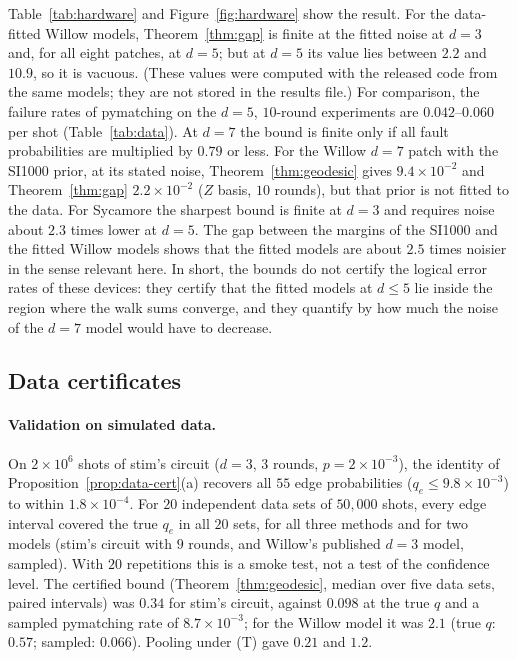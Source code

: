 \documentclass[11pt]{article}
\theoremstyle{plain}
\theoremstyle{definition}
\theoremstyle{remark}
\renewcommand{\_}{\oldunderscore\allowbreak}
\begin{document}
Table~\ref{tab:hardware} and Figure~\ref{fig:hardware} show the result. For the data-fitted Willow models, Theorem~\ref{thm:gap} is finite at the fitted noise at $d=3$ and, for all eight patches, at $d=5$; but at $d=5$ its value lies between $2.2$ and $10.9$, so it is vacuous. (These values were computed with the released code from the same models; they are not stored in the results file.) For comparison, the failure rates of pymatching on the $d=5$, $10$-round experiments are $0.042$--$0.060$ per shot (Table~\ref{tab:data}). At $d=7$ the bound is finite only if all fault probabilities are multiplied by $0.79$ or less. For the Willow $d=7$ patch with the SI1000 prior, at its stated noise, Theorem~\ref{thm:geodesic} gives $9.4\times10^{-2}$ and Theorem~\ref{thm:gap} $2.2\times10^{-2}$ ($Z$ basis, $10$ rounds), but that prior is not fitted to the data. For Sycamore the sharpest bound is finite at $d=3$ and requires noise about $2.3$ times lower at $d=5$. The gap between the margins of the SI1000 and the fitted Willow models shows that the fitted models are about $2.5$ times noisier in the sense relevant here. In short, the bounds do not certify the logical error rates of these devices: they certify that the fitted models at $d\le5$ lie inside the region where the walk sums converge, and they quantify by how much the noise of the $d=7$ model would have to decrease.

\subsection{Data certificates}

\paragraph{Validation on simulated data.} On $2\times10^6$ shots of stim's circuit ($d=3$, $3$ rounds, $p=2\times10^{-3}$), the identity of Proposition~\ref{prop:data-cert}(a) recovers all $55$ edge probabilities ($q_e\le9.8\times10^{-3}$) to within $1.8\times10^{-4}$. For $20$ independent data sets of $50{,}000$ shots, every edge interval covered the true $q_e$ in all $20$ sets, for all three methods and for two models (stim's circuit with $9$ rounds, and Willow's published $d=3$ model, sampled). With $20$ repetitions this is a smoke test, not a test of the confidence level. The certified bound (Theorem~\ref{thm:geodesic}, median over five data sets, paired intervals) was $0.34$ for stim's circuit, against $0.098$ at the true $q$ and a sampled pymatching rate of $8.7\times10^{-3}$; for the Willow model it was $2.1$ (true $q$: $0.57$; sampled: $0.066$). Pooling under (T) gave $0.21$ and $1.2$.
\end{document}

